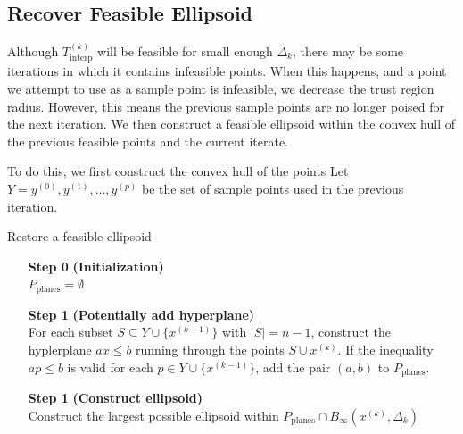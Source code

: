 \documentclass{article}
\newenvironment{comment}
  {\par\medskip
   \color{red}%
   \begin{framed}
   \textbf{Comment: }\ignorespaces}
 {\end{framed}
  \medskip}
\theoremstyle{case}
\newcommand{\dk}{\Delta_k}
\newcommand{\sampletrk}{{T_{\text{interp}}^{(k)}}}
\newcommand{\tr}{{ B_{\infty}\left(\xk, \dk\right) }}
\newcommand{\xk}{{x^{(k)}}}
\begin{document}
\subsection{Recover Feasible Ellipsoid}

Although $\sampletrk$ will be feasible for small enough $\dk$, there may be some iterations in which it contains infeasible points.
When this happens, and a point we attempt to use as a sample point is infeasible, we decrease the trust region radius.
However, this means the previous sample points are no longer poised for the next iteration.
We then construct a feasible ellipsoid within the convex hull of the previous feasible points and the current iterate.

%             
% 


To do this, we first construct the convex hull of the points 
Let $Y = y^{(0)}, y^{(1)}, \ldots, y^{(p)}$ be the set of sample points used in the previous iteration.

\begin{algorithm}[H]
    \caption{Restore a feasible ellipsoid}
    \label{restore_feasible_ellipsoid}
    \begin{itemize}
        \item[\textbf{Step 0}] \textbf{(Initialization)} \\
            $P_{\textrm{planes}} = \emptyset$
            
        \item[\textbf{Step 1}] \textbf{(Potentially add hyperplane)} \\
	    For each subset $S \subseteq Y \cup \{x^{(k-1)}\}$ with $|S| = n - 1$, construct the hyplerplane $ax\le b$ running through the points $S \cup \xk$.
	    If the inequality $ap \le b$ is valid for each $p \in Y \cup \{x^{(k-1)}\}$, add the pair $(a, b)$ to $P_{\textrm{planes}}$.
	
	\item[\textbf{Step 1}] \textbf{(Construct ellipsoid)} \\
	   Construct the largest possible ellipsoid within $P_{\textrm{planes}} \cap \tr$
    \end{itemize}
\end{algorithm}
\end{document}
